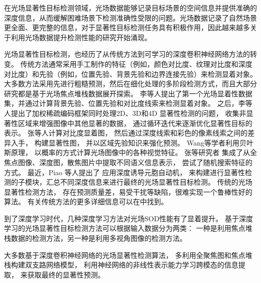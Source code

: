 在光场显著性目标检测领域，光场数据能够记录目标场景的空间信息并提供准确的深度信息，从而缓解困难场景下检测准确性受限的问题。光场数据记录了自然场景更全面、更完整的信息，对于显著性目标检测任务具有积极作用，因此越来越多关于利用光场数据提升检测性能的研究开始涌现。






光场显著性目标检测，也经历了从传统方法到可学习的深度卷积神经网络方法的转变。
传统方法通常采用手工制作的特征（例如，颜色对比度、纹理对比度和深度对比度）和先验（例如，位置先验、背景先验和边界连接先验）来检测显着对象。 
大多数方法采用先进行粗糙预测，然后在细化处理的多阶段检测方式，而且大部分研究都是基于光场焦点堆栈数据展开探索。
%
%
李等人提出了第一个光场显着性数据集，并通过计算背景先验、位置先验和对比度线索来检测显着对象。
之后，李等人提出了加权稀疏编码框架同时处理2D、3D和4D 显著性检测的问题，
收集非显著性区域来增强图像中其他显著的数据，
通过循环迭代来逐渐优化显著性目标的表示。
张等人计算对比度显着图，
然后通过深度线索和彩色的像素线索之间的差异入手，
构建显著性图，
并以区域先验知识来强化预测。
Wang等学者利用贝叶斯原理，
以概率的方式计算光场图像中的各种视觉特征。
张等研究者
集成了从全焦点图像、深度图，散焦图片中提取不同语义信息表示，
尝试了随机搜索特征的方式。
最近，Piao 等人提出了
应用深度诱导元胞自动机，
来构建进行显著性检测的子模块，汇总不同深度信息来进行最终的光场显著性目标检测。
传统的光场显著性检测方法，
存在预测质量差，易受干扰等缺陷，很难实现一个鲁棒性好的算法。
有关传统方法的更多详细信息可以在中找到。





到了深度学习时代，几种深度学习方法对光场SOD性能有了显着提升。 
基于深度学习的光场显著性目标检测方法可以根据输入数据分为两类：
一种是利用焦点堆栈数据的检测方法，另一种是利用多视角图像的检测方法。



大多数基于深度卷积神经网络的光场显著性检测算法，
多利用全聚焦图和焦点堆栈构建双支路网络模型，
利用神经网络的非线性表示能力学习跨模态的信息提取，
来获取最终的显著性预测。



